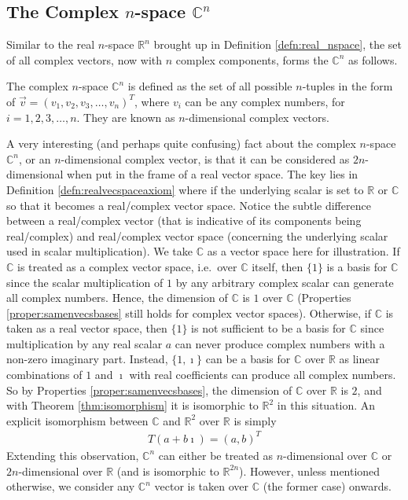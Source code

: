 \subsection{The Complex $n$-space $\mathbb{C}^n$}

Similar to the real $n$-space $\mathbb{R}^n$ brought up in Definition \ref{defn:real_nspace}, the set of all complex vectors, now with $n$ complex components, forms the  $\mathbb{C}^n$ as follows.
\begin{defn}
\label{defn:complex_nspace}
The complex $n$-space $\mathbb{C}^n$ is defined as the set of all possible $n$-tuples in the form of $\vec{v} = (v_1, v_2, v_3, \ldots, v_n)^T$, where $v_i$ can be any complex numbers, for $i = 1,2,3,\ldots,n$. They are known as $n$-dimensional complex vectors.
\end{defn}
A very interesting (and perhaps quite confusing) fact about the complex $n$-space $\mathbb{C}^n$, or an $n$-dimensional complex vector, is that it can be considered as $2n$-dimensional when put in the frame of a real vector space. The key lies in Definition \ref{defn:realvecspaceaxiom} where if the underlying scalar is set to $\mathbb{R}$ or $\mathbb{C}$ so that it becomes a real/complex vector space. Notice the subtle difference between a real/complex vector (that is indicative of its components being real/complex) and real/complex vector space (concerning the underlying scalar used in scalar multiplication). We take $\mathbb{C}$ as a vector space here for illustration. If $\mathbb{C}$ is treated as a complex vector space, i.e.\ over $\mathbb{C}$ itself, then $\{1\}$ is a basis for $\mathbb{C}$ since the scalar multiplication of $1$ by any arbitrary complex scalar can generate all complex numbers. Hence, the dimension of $\mathbb{C}$ is $1$ over $\mathbb{C}$ (Properties \ref{proper:samenvecsbases} still holds for complex vector spaces). Otherwise, if $\mathbb{C}$ is taken as a real vector space, then $\{1\}$ is not sufficient to be a basis for $\mathbb{C}$ since multiplication by any real scalar $a$ can never produce complex numbers with a non-zero imaginary part. Instead, $\{1, \imath\}$ can be a basis for $\mathbb{C}$ over $\mathbb{R}$ as linear combinations of $1$ and $\imath$ with real coefficients can produce all complex numbers. So by Properties \ref{proper:samenvecsbases}, the dimension of $\mathbb{C}$ over $\mathbb{R}$ is $2$, and with Theorem \ref{thm:isomorphism} it is isomorphic to $\mathbb{R}^2$ in this situation. An explicit isomorphism between $\mathbb{C}$ and $\mathbb{R}^2$ over $\mathbb{R}$ is simply
\begin{align*}
T(a+b\imath) = (a,b)^T
\end{align*}
Extending this observation, $\mathbb{C}^n$ can either be treated as $n$-dimensional over $\mathbb{C}$ or $2n$-dimensional over $\mathbb{R}$ (and is isomorphic to $\mathbb{R}^{2n}$). However, unless mentioned otherwise, we consider any $\mathbb{C}^n$ vector is taken over $\mathbb{C}$ (the former case) onwards.

